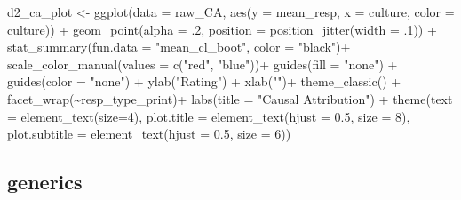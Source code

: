 \documentclass[
]{article}
\newenvironment{Shaded}{\begin{snugshade}}{\end{snugshade}}
\newcommand{\AttributeTok}[1]{\textcolor[rgb]{0.77,0.63,0.00}{#1}}
\newcommand{\DecValTok}[1]{\textcolor[rgb]{0.00,0.00,0.81}{#1}}
\newcommand{\FloatTok}[1]{\textcolor[rgb]{0.00,0.00,0.81}{#1}}
\newcommand{\FunctionTok}[1]{\textcolor[rgb]{0.00,0.00,0.00}{#1}}
\newcommand{\NormalTok}[1]{#1}
\newcommand{\OtherTok}[1]{\textcolor[rgb]{0.56,0.35,0.01}{#1}}
\newcommand{\SpecialCharTok}[1]{\textcolor[rgb]{0.00,0.00,0.00}{#1}}
\newcommand{\StringTok}[1]{\textcolor[rgb]{0.31,0.60,0.02}{#1}}
\begin{document}
\begin{Shaded}
\begin{Highlighting}[]
\NormalTok{d2\_ca\_plot }\OtherTok{\textless{}{-}} \FunctionTok{ggplot}\NormalTok{(}\AttributeTok{data =}\NormalTok{ raw\_CA, }
       \FunctionTok{aes}\NormalTok{(}\AttributeTok{y =}\NormalTok{ mean\_resp, }\AttributeTok{x =}\NormalTok{ culture, }\AttributeTok{color =}\NormalTok{ culture)) }\SpecialCharTok{+}
\FunctionTok{geom\_point}\NormalTok{(}\AttributeTok{alpha =}\NormalTok{ .}\DecValTok{2}\NormalTok{, }\AttributeTok{position =} \FunctionTok{position\_jitter}\NormalTok{(}\AttributeTok{width =}\NormalTok{ .}\DecValTok{1}\NormalTok{)) }\SpecialCharTok{+} 
                    \FunctionTok{stat\_summary}\NormalTok{(}\AttributeTok{fun.data =} \StringTok{"mean\_cl\_boot"}\NormalTok{, }\AttributeTok{color =} \StringTok{"black"}\NormalTok{)}\SpecialCharTok{+}
\FunctionTok{scale\_color\_manual}\NormalTok{(}\AttributeTok{values =} \FunctionTok{c}\NormalTok{(}\StringTok{"red"}\NormalTok{, }\StringTok{"blue"}\NormalTok{))}\SpecialCharTok{+}
\FunctionTok{guides}\NormalTok{(}\AttributeTok{fill =} \StringTok{"none"}\NormalTok{) }\SpecialCharTok{+}
\FunctionTok{guides}\NormalTok{(}\AttributeTok{color =} \StringTok{"none"}\NormalTok{) }\SpecialCharTok{+}
\FunctionTok{ylab}\NormalTok{(}\StringTok{"Rating"}\NormalTok{) }\SpecialCharTok{+} 
\FunctionTok{xlab}\NormalTok{(}\StringTok{""}\NormalTok{)}\SpecialCharTok{+}
\FunctionTok{theme\_classic}\NormalTok{() }\SpecialCharTok{+}
  \FunctionTok{facet\_wrap}\NormalTok{(}\SpecialCharTok{\textasciitilde{}}\NormalTok{resp\_type\_print)}\SpecialCharTok{+}
  \FunctionTok{labs}\NormalTok{(}\AttributeTok{title =} \StringTok{"Causal Attribution"}\NormalTok{)  }\SpecialCharTok{+} 
  \FunctionTok{theme}\NormalTok{(}\AttributeTok{text =} \FunctionTok{element\_text}\NormalTok{(}\AttributeTok{size=}\DecValTok{4}\NormalTok{),}
      \AttributeTok{plot.title =} \FunctionTok{element\_text}\NormalTok{(}\AttributeTok{hjust =} \FloatTok{0.5}\NormalTok{, }\AttributeTok{size =} \DecValTok{8}\NormalTok{), }
      \AttributeTok{plot.subtitle =} \FunctionTok{element\_text}\NormalTok{(}\AttributeTok{hjust =} \FloatTok{0.5}\NormalTok{, }\AttributeTok{size =} \DecValTok{6}\NormalTok{)) }
\end{Highlighting}
\end{Shaded}

\hypertarget{generics-1}{%
\subsection{generics}\label{generics-1}}
\end{document}
